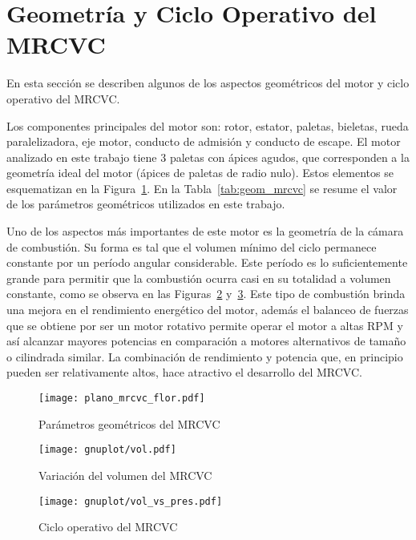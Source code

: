 \section{Geometría y Ciclo Operativo del MRCVC}
%
En esta sección se describen algunos de los aspectos geométricos del motor y
ciclo operativo del MRCVC.

Los componentes principales del motor son: rotor, estator, paletas, bieletas,
rueda paralelizadora, eje motor, conducto de admisión y conducto de escape.
%
El motor analizado en este trabajo tiene 3 paletas con ápices agudos, que
corresponden a la geometría ideal del motor (ápices de paletas de radio nulo).
%
Estos elementos se esquematizan en la Figura~\ref{fig:geom_flor_mrcvc}.
%
En la Tabla~\ref{tab:geom_mrcvc} se resume el valor de los parámetros
geométricos utilizados en este trabajo.

Uno de los aspectos más importantes de este motor es la geometría de la cámara
de combustión.
%
Su forma es tal que el volumen mínimo del ciclo permanece constante por un
período angular considerable. %
%
Este período es lo suficientemente grande para permitir que la combustión ocurra
casi en su totalidad a volumen constante, como se observa en las
Figuras~\ref{fig:mrcvc_vol_cte} y~\ref{fig:PV_mrcvc}.
%
Este tipo de combustión brinda una mejora en el rendimiento energético del
motor, además el balanceo de fuerzas que se obtiene por ser un motor rotativo
permite operar el motor a altas RPM y así alcanzar mayores potencias en
comparación a motores alternativos de tamaño o cilindrada similar.
%
La combinación de rendimiento y potencia que, en principio pueden ser
relativamente altos, hace atractivo el desarrollo del MRCVC.
%

\begin{figure}[h!]  \centering
\texttt{[image: plano\_mrcvc\_flor.pdf]}
  \caption{Parámetros geométricos del
MRCVC~\parencite{roldan20}}\label{fig:geom_flor_mrcvc}
\end{figure}

\begin{figure}[h!]  \centering
\texttt{[image: gnuplot/vol.pdf]}
  \caption{Variación del volumen del MRCVC}\label{fig:mrcvc_vol_cte}
\end{figure}

\begin{figure}[h!]  \centering
\texttt{[image: gnuplot/vol\_vs\_pres.pdf]}
  \caption{Ciclo operativo del MRCVC}\label{fig:PV_mrcvc}
\end{figure}

